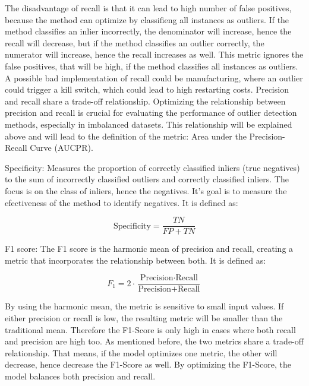     The disadvantage of recall is that it can lead to high number of false positives, because the method can optimize by classifieng all instances as outliers.
    If the method classifies an inlier incorrectly, the denominator will increase, hence the recall will decrease, but if the method classifies an outlier correctly, the numerator will increase, hence the recall increases as well.
    This metric ignores the false positives, that will be high, if the method classifies all instances as outliers.
    A possible bad implementation of recall could be manufacturing, where an outlier could trigger a kill switch, which could lead to high restarting costs.
    Precision and recall share a trade-off relationship. 
    Optimizing the relationship between precision and recall is crucial for evaluating the performance of outlier detection methods, especially in imbalanced datasets.
    This relationship will be explained above and will lead to the definition of the metric: Area under the Precision-Recall Curve (AUCPR).

    \item Specificity: Measures the proportion of correctly classified inliers (true negatives) to the sum of incorrectly classified outliers and correctly classified inliers.
    The focus is on the class of inliers, hence the negatives.
    It's goal is to measure the efectiveness of the method to identify negatives.
    It is defined as:

    \begin{equation}
        \text{Specificity} = \frac{TN}{FP + TN}
    \end{equation}

    \item F1 score: The F1 score is the harmonic mean of precision and recall, creating a metric that incorporates the relationship between both. 
    It is defined as: 
    
    \begin{equation}
    F_1 = 2 \cdot \frac{\text{Precision} \cdot \text{Recall}}{\text{Precision} + \text{Recall}}
    \end{equation}

    By using the harmonic mean, the metric is sensitive to small input values.
    If either precision or recall is low, the resulting metric will be smaller than the traditional mean. 
    Therefore the F1-Score is only high in cases where both recall and precision are high too.
    As mentioned before, the two metrics share a trade-off relationship.
    That means, if the model optimizes one metric, the other will decrease, hence decrease the F1-Score as well.
    By optimizing the F1-Score, the model balances both precision and recall.


